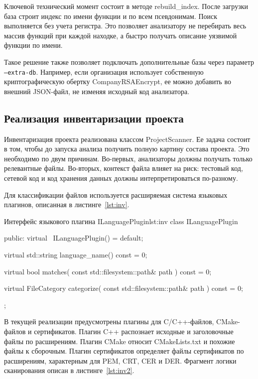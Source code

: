 \documentclass{itmo-vkr}
\begin{document}
Ключевой технический момент состоит в методе rebuild\_index. После загрузки база строит индекс по имени функции и по всем псевдонимам. Поиск выполняется без учета регистра. Это позволяет анализатору не перебирать весь массив функций при каждой находке, а быстро получать описание уязвимой функции по имени.

Такое решение также позволяет подключать дополнительные базы через параметр \texttt{--extra-db}. Например, если организация использует собственную криптографическую обертку CompanyRSAEncrypt, ее можно добавить во внешний JSON-файл, не изменяя исходный код анализатора.

\subsection{Реализация инвентаризации проекта}

Инвентаризация проекта реализована классом ProjectScanner. Ее задача состоит в том, чтобы до запуска анализа получить полную картину состава проекта. Это необходимо по двум причинам. Во-первых, анализаторы должны получать только релевантные файлы. Во-вторых, контекст файла влияет на риск: тестовый код, сетевой код и код хранения данных должны интерпретироваться по-разному.

Для классификации файлов используется расширяемая система языковых плагинов, описанная в листинге~\ref{lst:inv}.

\begin{itmolisting}[C++]{Интерфейс языкового плагина ILanguagePlugin}{lst:inv}
class ILanguagePlugin {
	public:
	virtual ~ILanguagePlugin() = default;
	
	virtual std::string language_name() const = 0;
	
	virtual bool matches(
	const std::filesystem::path& path
	) const = 0;
	
	virtual FileCategory categorize(
	const std::filesystem::path& path
	) const = 0;
};
\end{itmolisting}

В текущей реализации предусмотрены плагины для C/C++-файлов, CMake-файлов и сертификатов. Плагин C++ распознает исходные и заголовочные файлы по расширениям. Плагин CMake относит CMakeLists.txt и похожие файлы к сборочным. Плагин сертификатов определяет файлы сертификатов по расширениям, характерным для PEM, CRT, CER и DER. Фрагмент логики сканирования описан в листинге~\ref{lst:inv2}.
\end{document}
